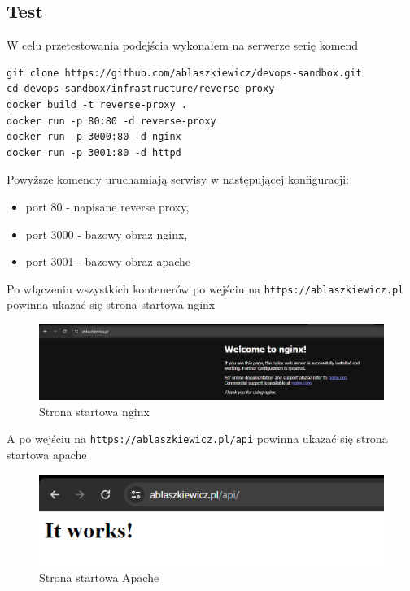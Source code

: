 \documentclass{article}
\begin{document}
\subsection{Test}

W celu przetestowania podejścia wykonałem na serwerze serię komend

\begin{lstlisting}[caption=Komendy włączające reverse proxy na serwerze]
git clone https://github.com/ablaszkiewicz/devops-sandbox.git
cd devops-sandbox/infrastructure/reverse-proxy
docker build -t reverse-proxy .
docker run -p 80:80 -d reverse-proxy
docker run -p 3000:80 -d nginx
docker run -p 3001:80 -d httpd
\end{lstlisting}

Powyższe komendy uruchamiają serwisy w następującej konfiguracji:
\begin{itemize}
    \item port 80 - napisane reverse proxy,
    \item port 3000 - bazowy obraz nginx,
    \item port 3001 - bazowy obraz apache
\end{itemize}

Po włączeniu wszystkich kontenerów po wejściu na \lstinline|https://ablaszkiewicz.pl| powinna ukazać się strona startowa nginx

\begin{figure}[H]
    \centering
    \includegraphics[width=1\linewidth]{reverseProxyNginx.png}
    \caption{Strona startowa nginx}
    \label{fig:enter-label}
\end{figure}

A po wejściu na \lstinline|https://ablaszkiewicz.pl/api| powinna ukazać się strona startowa apache

\begin{figure}[H]
    \centering
    \includegraphics[width=1\linewidth]{reverseProxyApache.png}
    \caption{Strona startowa Apache}
    \label{fig:enter-label}
\end{figure}
\end{document}
